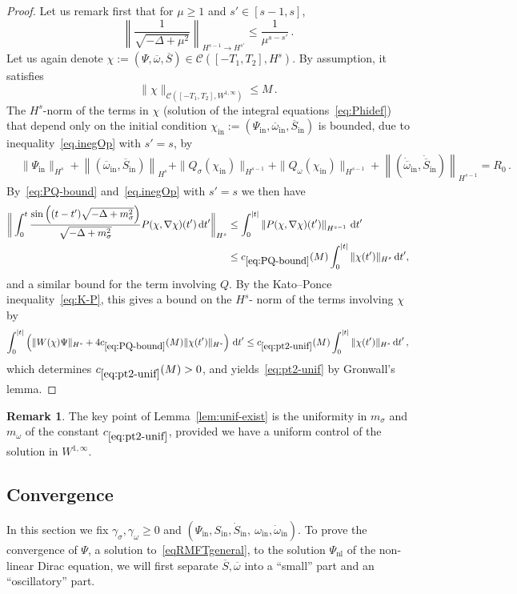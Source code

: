 \documentclass[10pt]{amsart}
\theoremstyle{definition}\newtheorem{defi}[theo]{Definition}\newtheorem{rema}[theo]{Remark}\newtheorem{exam}[theo]{Example}\newtheorem{exem}[theo]{Example}\newtheorem{nota}[theo]{Notation}
\newcommand{\rmin}{\mathrm{in}}
\newcommand{\nl}{\mathrm{nl}}
\newcommand{\cC}{\mathcal{C}}
\newcommand\ii{{\ensuremath {\infty}}}
\renewcommand\d[1]{{\ensuremath{\,\text{d}#1}}}
\begin{document}
\begin{proof}
Let us remark first that for $\mu\geq 1$ and $s'\in[s-1,s]$,
\begin{equation}\label{eq.inegOp}
\left\|\frac{1}{\sqrt{-\Delta+\mu^2}}\right\|_{H^{s-1}\to H^{s'}} \leq \frac{1}{\mu^{s-s'}}\,.
\end{equation}
Let us again denote $\chi := (\Psi,\overline{\omega},\overline{S})\in \cC([-T_1,T_2],{H}^s)$. By assumption, it satisfies
\[
\|\chi\|_{\cC\left([-T_1,T_2],W^{1,\infty}\right)}
\leq M\,.
\]
The $H^s$-norm of the terms in $\chi$ (solution of the integral equations~\eqref{eq:Phidef}) that depend only on the initial condition $\chi_\rmin:=(\Psi_\rmin, \overline{\omega}_\rmin,\overline{S}_\rmin)$ is bounded, due to inequality~\eqref{eq.inegOp} with $s'=s$, by
\begin{align*}
&\|\Psi_\rmin\|_{H^s} +
\left\|(\overline{\omega}_\rmin,\overline{S}_\rmin) \right\|_{H^s} +
\|Q_\sigma(\chi_\rmin)\|_{H^{s-1}} + \|Q_\omega(\chi_\rmin)\|_{H^{s-1}} +
\left\|(\dot{\overline{\omega}}_\rmin,\dot{\overline{S}}_\rmin)\right\|_{H^{s-1}}=R_0\,.
\end{align*}
By~\eqref{eq:PQ-bound} and~\eqref{eq.inegOp} with $s'=s$ we then have
\begin{align*}
\bigg\| \int_0^t\frac{\sin\left((t-t')\sqrt{-\Delta + m^2_\sigma}\right)}{\sqrt{-\Delta + m^2_\sigma}}P(\chi, \nabla\chi)(t')\d t'\bigg\|_{H^s} &\leq
\int_0^{|t|}\left\| P(\chi, \nabla\chi)(t')\right\|_{H^{s-1}} \d t' \\
&\leq c_{\eqref{eq:PQ-bound}}(M) \int_0^{|t|} \|\chi(t')\|_{H^s}\d t',
\end{align*}
and a similar bound for the term involving $Q$. By the Kato--Ponce inequality~\eqref{eq:K-P}, this gives a bound on the $H^s$- norm of the terms involving $\chi$ by
\[
\int_0^{|t|}
\left(
\|W(\chi)\Psi\|_{H^s}+ 4 c_{\eqref{eq:PQ-bound}} (M)\|\chi(t')\|_{H^s} \right)\d t'
\leq c_{\eqref{eq:pt2-unif}}(M)\int_0^{|t|}
\|\chi(t')\|_{{H}^s}\d t'\,,
\]
which determines $c_{\eqref{eq:pt2-unif}}(M)>0$, and yields~\eqref{eq:pt2-unif} by Gronwall's lemma.
\end{proof}

\begin{rema}
The key point of Lemma~\ref{lem:unif-exist} is the uniformity in $m_\sigma$ and $m_\omega$ of the constant $c_{\eqref{eq:pt2-unif}}$, provided we have a uniform control of the solution in $W^{1,\ii}$.
\end{rema}


\subsection{Convergence} 
In this section we fix $\gamma_\sigma, \gamma_\omega\geq 0$ and $(\Psi_\rmin, S_\rmin, \dot S_\rmin, \ \omega_\rmin, \dot \omega_\rmin)$. To prove the convergence of $\Psi$, a solution to~\eqref{eqRMFTgeneral}, to the solution $\Psi_\nl$ of the non-linear Dirac equation, we will first separate $\overline{S}, \overline{\omega}$ into a ``small'' part and an ``oscillatory'' part.
\end{document}
